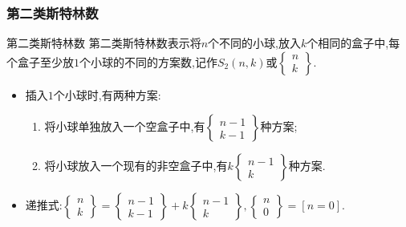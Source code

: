 \documentclass[aspectratio=169]{beamer}  %
\newcommand{\pau}{\pause}
\begin{document}
\begin{frame}[fragile]
    \frametitle{第二类斯特林数}
    \begin{block}{第二类斯特林数}
        第二类斯特林数表示将$n$个不同的小球,放入$k$个相同的盒子中,每个盒子至少放$1$个小球的不同的方案数,记作$S_2(n,k)$或$\begin{Bmatrix}n\\k\end{Bmatrix}$.
    \end{block}\pau
    \begin{itemize}
        \item 插入$1$个小球时,有两种方案:\pau
        \begin{enumerate}
        	\item 将小球单独放入一个空盒子中,有$\begin{Bmatrix}n-1\\k-1\end{Bmatrix}$种方案;\pau
        	\item 将小球放入一个现有的非空盒子中,有$k\begin{Bmatrix}n-1\\k\end{Bmatrix}$种方案.\pau
        \end{enumerate}
        \item 递推式:$\begin{Bmatrix}n\\k\end{Bmatrix}=\begin{Bmatrix}n-1\\k-1\end{Bmatrix}+k\begin{Bmatrix}n-1\\k\end{Bmatrix},\begin{Bmatrix}n\\0\end{Bmatrix}=[n=0]$.
    \end{itemize}
\end{frame}
\end{document}
